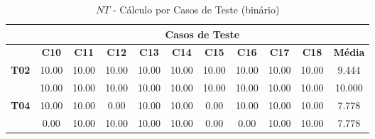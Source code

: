 \begin{table}[htbp]
	\centering
	\caption{$NT$ - Cálculo por Casos de Teste (binário)}
	\begin{tabular}{c|cccccccccc|}
		\cline{2-11}
		\rowcolor[HTML]{D0CECE} 
		\cellcolor[HTML]{F2F2F2}\textbf{} & \multicolumn{10}{c|}{\cellcolor[HTML]{D0CECE}\textbf{Casos de Teste}} \\ \hline
		\rowcolor[HTML]{D9D9D9} 
		\multicolumn{1}{|c|}{\cellcolor[HTML]{D0CECE}\textbf{Part.}} & \multicolumn{1}{c|}{\cellcolor[HTML]{D9D9D9}\textbf{C10}} & \multicolumn{1}{c|}{\cellcolor[HTML]{D9D9D9}\textbf{C11}} & \multicolumn{1}{c|}{\cellcolor[HTML]{D9D9D9}\textbf{C12}} & \multicolumn{1}{c|}{\cellcolor[HTML]{D9D9D9}\textbf{C13}} & \multicolumn{1}{c|}{\cellcolor[HTML]{D9D9D9}\textbf{C14}} & \multicolumn{1}{c|}{\cellcolor[HTML]{D9D9D9}\textbf{C15}} & \multicolumn{1}{c|}{\cellcolor[HTML]{D9D9D9}\textbf{C16}} & \multicolumn{1}{c|}{\cellcolor[HTML]{D9D9D9}\textbf{C17}} & \multicolumn{1}{c|}{\cellcolor[HTML]{D9D9D9}\textbf{C18}} & \textbf{Média} \\ \hline
		\multicolumn{1}{|c|}{\textbf{T02}} & \multicolumn{1}{c|}{10.00} & \multicolumn{1}{c|}{10.00} & \multicolumn{1}{c|}{10.00} & \multicolumn{1}{c|}{10.00} & \multicolumn{1}{c|}{10.00} & \multicolumn{1}{c|}{10.00} & \multicolumn{1}{c|}{10.00} & \multicolumn{1}{c|}{10.00} & \multicolumn{1}{c|}{10.00} & 9.444 \\ \hline
		\rowcolor[HTML]{F2F2F2} 
		\multicolumn{1}{|c|}{\cellcolor[HTML]{F2F2F2}\textbf{T03}} & \multicolumn{1}{c|}{\cellcolor[HTML]{F2F2F2}10.00} & \multicolumn{1}{c|}{\cellcolor[HTML]{F2F2F2}10.00} & \multicolumn{1}{c|}{\cellcolor[HTML]{F2F2F2}10.00} & \multicolumn{1}{c|}{\cellcolor[HTML]{F2F2F2}10.00} & \multicolumn{1}{c|}{\cellcolor[HTML]{F2F2F2}10.00} & \multicolumn{1}{c|}{\cellcolor[HTML]{F2F2F2}10.00} & \multicolumn{1}{c|}{\cellcolor[HTML]{F2F2F2}10.00} & \multicolumn{1}{c|}{\cellcolor[HTML]{F2F2F2}10.00} & \multicolumn{1}{c|}{\cellcolor[HTML]{F2F2F2}10.00} & 10.000 \\ \hline
		\multicolumn{1}{|c|}{\textbf{T04}} & \multicolumn{1}{c|}{10.00} & \multicolumn{1}{c|}{10.00} & \multicolumn{1}{c|}{0.00} & \multicolumn{1}{c|}{10.00} & \multicolumn{1}{c|}{10.00} & \multicolumn{1}{c|}{0.00} & \multicolumn{1}{c|}{10.00} & \multicolumn{1}{c|}{10.00} & \multicolumn{1}{c|}{10.00} & 7.778 \\ \hline
		\rowcolor[HTML]{F2F2F2} 
		\multicolumn{1}{|c|}{\cellcolor[HTML]{F2F2F2}\textbf{T05}} & \multicolumn{1}{c|}{\cellcolor[HTML]{F2F2F2}0.00} & \multicolumn{1}{c|}{\cellcolor[HTML]{F2F2F2}10.00} & \multicolumn{1}{c|}{\cellcolor[HTML]{F2F2F2}10.00} & \multicolumn{1}{c|}{\cellcolor[HTML]{F2F2F2}10.00} & \multicolumn{1}{c|}{\cellcolor[HTML]{F2F2F2}10.00} & \multicolumn{1}{c|}{\cellcolor[HTML]{F2F2F2}0.00} & \multicolumn{1}{c|}{\cellcolor[HTML]{F2F2F2}0.00} & \multicolumn{1}{c|}{\cellcolor[HTML]{F2F2F2}10.00} & \multicolumn{1}{c|}{\cellcolor[HTML]{F2F2F2}10.00} & 7.778 \\ \hline

\end{tabular}
\end{table}
